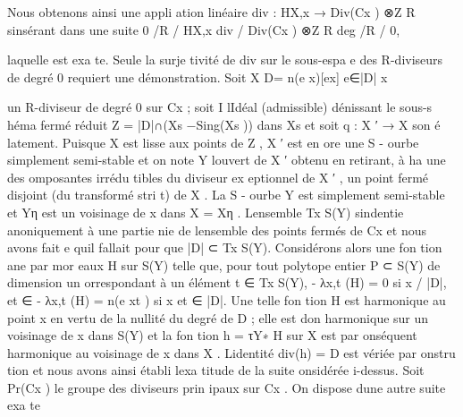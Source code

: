 \documentclass[
  10pt,
]{article}
\newenvironment{Shaded}{}{}
\newcommand{\NormalTok}[1]{#1}
\begin{document}
\begin{Shaded}
\begin{Highlighting}[]
\NormalTok{  Nous obtenons ainsi une appli ation linéaire div : HX,x → Div(Cx ) ⊗Z R s\textquotesingle{}insérant dans}
\NormalTok{une suite}
\NormalTok{                  0       /R      / HX,x   div   / Div(Cx ) ⊗Z R deg   /R     / 0,}

\NormalTok{laquelle est exa te. Seule la surje tivité de div sur le sous{-}espa e des R{-}diviseurs de degré 0}
\NormalTok{requiert une démonstration. Soit}
\NormalTok{                                              X}
\NormalTok{                                        D=        n(e}
\NormalTok{                                                    x)[ex]}
\NormalTok{                                             e∈|D|}
\NormalTok{                                             x}

\NormalTok{un R{-}diviseur de degré 0 sur Cx ; soit I l\textquotesingle{}Idéal (admissible) dénissant le sous{-}s héma fermé}
\NormalTok{réduit Z = |D|∩(Xs −Sing(Xs )) dans Xs et soit q : X ′ → X son é latement. Puisque X est lisse}
\NormalTok{aux points de Z , X ′ est en ore une S {-} ourbe simplement semi{-}stable et on note Y l\textquotesingle{}ouvert de}
\NormalTok{X ′ obtenu en retirant, à ha une des omposantes irrédu tibles du diviseur ex eptionnel de X ′ ,}
\NormalTok{un point fermé disjoint (du transformé stri t) de X . La S {-} ourbe Y est simplement semi{-}stable}
\NormalTok{et Yη est un voisinage de x dans X = Xη . L\textquotesingle{}ensemble Tx S(Y) s\textquotesingle{}indentie anoniquement à}
\NormalTok{une partie nie de l\textquotesingle{}ensemble des points fermés de Cx et nous avons fait e qu\textquotesingle{}il fallait pour}
\NormalTok{que}
\NormalTok{                                         |D| ⊂ Tx S(Y).}
\NormalTok{Considérons alors une fon tion ane par mor eaux H sur S(Y) telle que, pour tout polytope}
\NormalTok{entier P ⊂ S(Y) de dimension un orrespondant à un élément t ∈ Tx S(Y),}
\NormalTok{{-} λx,t (H) = 0 si x  / |D|,}
\NormalTok{                  et ∈}
\NormalTok{{-} λx,t (H) = n(e}
\NormalTok{               xt ) si x}
\NormalTok{                       et ∈ |D|.}
\NormalTok{   Une telle fon tion H est harmonique au point x en vertu de la nullité du degré de D ; elle}
\NormalTok{est don harmonique sur un voisinage de x dans S(Y) et la fon tion h = τY∗ H sur X est par}
\NormalTok{ onséquent harmonique au voisinage de x dans X . L\textquotesingle{}identité}
\NormalTok{                                           div(h) = D}
\NormalTok{est vériée par onstru tion et nous avons ainsi établi l\textquotesingle{}exa titude de la suite onsidérée}
\NormalTok{ i{-}dessus.}
\NormalTok{  Soit Pr(Cx ) le groupe des diviseurs prin ipaux sur Cx . On dispose d\textquotesingle{}une autre suite exa te}


\end{Highlighting}
\end{Shaded}
\end{document}
